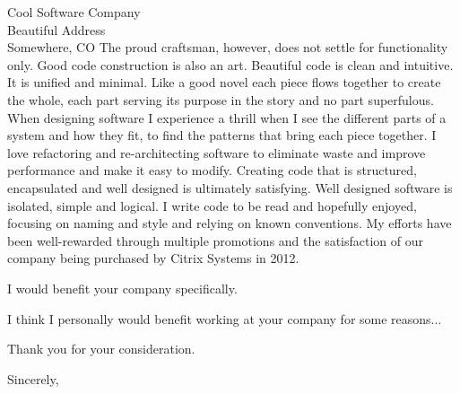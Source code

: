 \documentclass{letter}
\begin{document}
\begin{letter}{Cool Software Company\\Beautiful Address\\Somewhere, CO}
The proud craftsman, however, does not settle for functionality only.  Good
code construction is also an art.  Beautiful code is clean and intuitive.  It is
unified and minimal.  Like a good novel each piece flows together to create the
whole, each part serving its purpose in the story and no part superfulous.
When designing software I experience a thrill
when I see the different parts of a system and how they fit,  
to find the patterns that bring each piece together.  
I love refactoring and re-architecting software to eliminate waste and improve
performance and make it easy to modify.  Creating code that is structured,
encapsulated and well designed is ultimately satisfying.
Well designed software is isolated, simple and logical.
I write code to be read and hopefully enjoyed, focusing on naming
and style and relying on known conventions.
My efforts have been well-rewarded through multiple promotions and the
satisfaction of our company being purchased by Citrix Systems in 2012.

I would benefit your company specifically.

I think I personally would benefit working at your company for some reasons...

Thank you for your consideration.

\closing{Sincerely,}
\end{letter}
\end{document}

